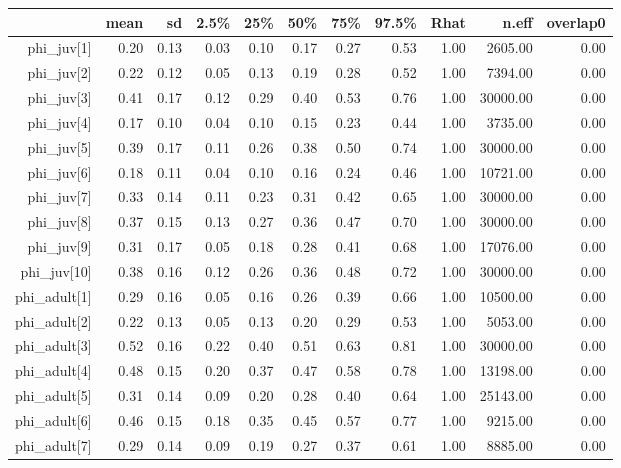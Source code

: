 \begin{table}[ht]
\centering
\begin{tabular}{rrrrrrrrrrr}
  \hline
 & mean & sd & 2.5\% & 25\% & 50\% & 75\% & 97.5\% & Rhat & n.eff & overlap0 \\ 
  \hline
phi\_juv[1] & 0.20 & 0.13 & 0.03 & 0.10 & 0.17 & 0.27 & 0.53 & 1.00 & 2605.00 & 0.00 \\ 
  phi\_juv[2] & 0.22 & 0.12 & 0.05 & 0.13 & 0.19 & 0.28 & 0.52 & 1.00 & 7394.00 & 0.00 \\ 
  phi\_juv[3] & 0.41 & 0.17 & 0.12 & 0.29 & 0.40 & 0.53 & 0.76 & 1.00 & 30000.00 & 0.00 \\ 
  phi\_juv[4] & 0.17 & 0.10 & 0.04 & 0.10 & 0.15 & 0.23 & 0.44 & 1.00 & 3735.00 & 0.00 \\ 
  phi\_juv[5] & 0.39 & 0.17 & 0.11 & 0.26 & 0.38 & 0.50 & 0.74 & 1.00 & 30000.00 & 0.00 \\ 
  phi\_juv[6] & 0.18 & 0.11 & 0.04 & 0.10 & 0.16 & 0.24 & 0.46 & 1.00 & 10721.00 & 0.00 \\ 
  phi\_juv[7] & 0.33 & 0.14 & 0.11 & 0.23 & 0.31 & 0.42 & 0.65 & 1.00 & 30000.00 & 0.00 \\ 
  phi\_juv[8] & 0.37 & 0.15 & 0.13 & 0.27 & 0.36 & 0.47 & 0.70 & 1.00 & 30000.00 & 0.00 \\ 
  phi\_juv[9] & 0.31 & 0.17 & 0.05 & 0.18 & 0.28 & 0.41 & 0.68 & 1.00 & 17076.00 & 0.00 \\ 
  phi\_juv[10] & 0.38 & 0.16 & 0.12 & 0.26 & 0.36 & 0.48 & 0.72 & 1.00 & 30000.00 & 0.00 \\ 
  phi\_adult[1] & 0.29 & 0.16 & 0.05 & 0.16 & 0.26 & 0.39 & 0.66 & 1.00 & 10500.00 & 0.00 \\ 
  phi\_adult[2] & 0.22 & 0.13 & 0.05 & 0.13 & 0.20 & 0.29 & 0.53 & 1.00 & 5053.00 & 0.00 \\ 
  phi\_adult[3] & 0.52 & 0.16 & 0.22 & 0.40 & 0.51 & 0.63 & 0.81 & 1.00 & 30000.00 & 0.00 \\ 
  phi\_adult[4] & 0.48 & 0.15 & 0.20 & 0.37 & 0.47 & 0.58 & 0.78 & 1.00 & 13198.00 & 0.00 \\ 
  phi\_adult[5] & 0.31 & 0.14 & 0.09 & 0.20 & 0.28 & 0.40 & 0.64 & 1.00 & 25143.00 & 0.00 \\ 
  phi\_adult[6] & 0.46 & 0.15 & 0.18 & 0.35 & 0.45 & 0.57 & 0.77 & 1.00 & 9215.00 & 0.00 \\ 
  phi\_adult[7] & 0.29 & 0.14 & 0.09 & 0.19 & 0.27 & 0.37 & 0.61 & 1.00 & 8885.00 & 0.00 \\ 

\end{tabular}
\end{table}

